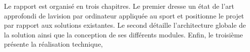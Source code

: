Le rapport est organisé en trois chapitres. Le premier dresse un état de l’art approfondi de lavision par ordinateur appliquée au sport et positionne le projet par rapport aux solutions
existantes. Le second détaille l’architecture globale de la solution ainsi que la conception de
ses différents modules. Enfin, le troisième présente la réalisation technique, 